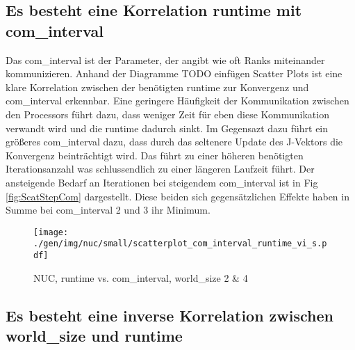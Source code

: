 \subsection{Es besteht eine Korrelation runtime mit com\_interval}

Das com\_interval ist der Parameter, der angibt wie oft Ranks miteinander kommunizieren.
Anhand der Diagramme TODO einfügen Scatter Plots
ist eine klare Korrelation zwischen der benötigten runtime zur Konvergenz und com\_interval erkennbar.
Eine geringere Häufigkeit der Kommunikation zwischen den Processors führt dazu, dass weniger Zeit für eben diese Kommunikation
verwandt wird und die runtime dadurch sinkt. Im Gegensazt dazu führt ein größeres com\_interval dazu, dass durch das seltenere
Update des J-Vektors die Konvergenz beinträchtigt wird. Das führt zu einer höheren benötigten Iterationsanzahl was schlussendlich
zu einer längeren Laufzeit führt. Der ansteigende Bedarf an Iterationen bei steigendem com\_interval ist in Fig \ref{fig:ScatStepCom}
dargestellt.
Diese beiden sich gegensätzlichen Effekte haben in Summe bei com\_interval 2 und 3 ihr Minimum.

\begin{figure}[h]
\texttt{[image: ./gen/img/nuc/small/scatterplot\_com\_interval\_runtime\_vi\_s.pdf]}
\caption{NUC, runtime vs. com\_interval, world\_size 2 \& 4}
\label{fig:ScatRunCom}
\end{figure}

\begin{figure}[h]
    	\hfill
{}
\end{figure}

\subsection{Es besteht eine inverse Korrelation zwischen world\_size und runtime}

